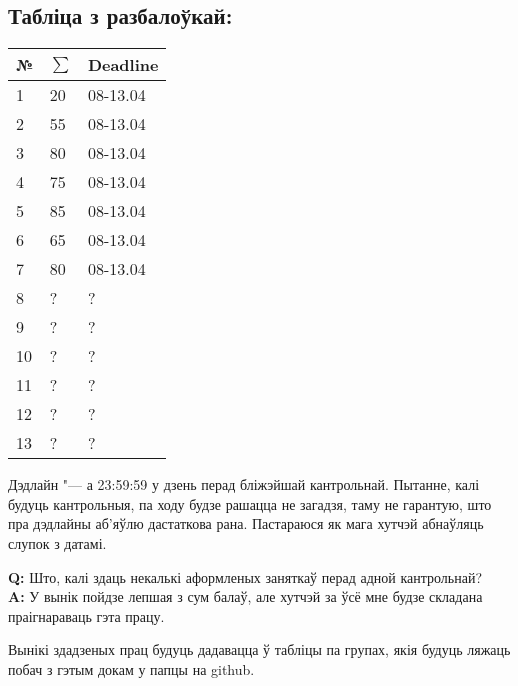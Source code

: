 \documentclass[12pt, a4paper]{extarticle}
\newcommand{\formQA}[2]{%
	\noindent \textbf{Q:} #1 \\
	\textbf{A:} #2
}
\begin{document}
	\subsection{Табліца з разбалоўкай:}
	\begin{table}[H]
		\begin{center}
			\begin{tabular}{|l|l|l|}
				\hline
				\bf №  & $\sum$ & \bf Deadline  \\ \hline
				1    & 20 & 08-13.04\\ \hline
				2   & 55 & 08-13.04 \\ \hline
				3   & 80 & 08-13.04 \\ \hline
				4   & 75 & 08-13.04 \\ \hline
				5   & 85 & 08-13.04 \\ \hline
				6   & 65 & 08-13.04 \\ \hline
				7   & 80 & 08-13.04 \\ \hline
				8   & ? & ?  \\ \hline
				9   & ? & ?  \\ \hline
				10   & ? & ?  \\ \hline
				11   & ? & ?  \\ \hline
				12   & ? & ?  \\ \hline
				13   & ? & ?  \\ \hline
			\end{tabular}
		\end{center}
	\end{table}
	
	Дэдлайн "--- а 23:59:59 у дзень перад бліжэйшай кантрольнай. Пытанне, калі будуць кантрольныя, па ходу будзе рашацца не загадзя, таму не гарантую, што пра дэдлайны аб'яўлю дастаткова рана. Пастараюся як мага хутчэй абнаўляць слупок з датамі.
	
	\formQA{Што, калі здаць некалькі аформленых заняткаў перад адной кантрольнай?}
	{У вынік пойдзе лепшая з сум балаў, але хутчэй за ўсё мне будзе складана праігнараваць гэта працу.}
	
	Вынікі здадзеных прац будуць дадавацца ў табліцы па групах, якія будуць ляжаць побач з гэтым докам у папцы на github.
\end{document}
